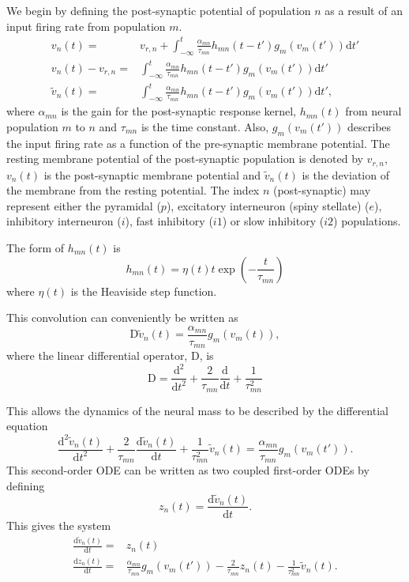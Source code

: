 \documentclass[]{article}
\begin{document}
We begin by defining the post-synaptic potential of population $n$ as a result of an input firing rate from population $m$.
\begin{align}
	v_n(t) =& v_{r,n} + \int_{-\infty}^t \frac{\alpha_{mn}}{\tau_{mn}} h_{mn}(t-t')g_m(v_m(t')) \mathrm{d}t' \\
	v_n(t) - v_{r,n} =& \int_{-\infty}^t \frac{\alpha_{mn}}{\tau_{mn}} h_{mn}(t-t')g_m(v_m(t')) \mathrm{d}t' \\
	\tilde v_n(t) =& \int_{-\infty}^t \frac{\alpha_{mn}}{\tau_{mn}} h_{mn}(t-t')g_m(v_m(t')) \mathrm{d}t',
\end{align}
where $\alpha_{mn}$ is the gain for the post-synaptic response kernel, $h_{mn}(t)$ from neural population $m$ to $n$ and $\tau_{mn}$ is the time constant. Also, $g_m(v_m(t'))$ describes the input firing rate as a function of the pre-synaptic membrane potential. The resting membrane potential of the post-synaptic population is denoted by $v_{r,n}$, $v_n(t)$ is the post-synaptic membrane potential and $\tilde v_n(t)$ is the deviation of the membrane from the resting potential. The index $n$ (post-synaptic) may represent either the pyramidal ($p$), excitatory interneuron (spiny stellate) ($e$), inhibitory interneuron ($i$), fast inhibitory ($i1$) or slow inhibitory ($i2$) populations.  

The form of $h_{mn}(t)$ is 
\begin{equation}
	h_{mn}(t) = \eta(t)t\exp\left(-\frac{t}{\tau_{mn}}\right)
\end{equation}
where $\eta(t)$ is the Heaviside step function.

This convolution can conveniently be written as
\begin{equation}
	\mathrm{D}\tilde v_n(t) = \frac{\alpha_{mn}}{\tau_{mn}} g_m(v_m(t)),
\end{equation}
where the linear differential operator, $\mathrm{D}$, is
\begin{equation}
	\mathrm{D} = \frac{\mathrm{d}^2}{\mathrm{d}t^2} + \frac{2}{\tau_{mn}}\frac{\mathrm{d}}{\mathrm{d}t} + \frac{1}{\tau_{mn}^2}
\end{equation}

This allows the dynamics of the neural mass to be described by the differential equation
\begin{equation}
	\frac{\mathrm{d}^2\tilde v_n(t)}{\mathrm{d}t^2} + \frac{2}{\tau_{mn}}\frac{\mathrm{d}\tilde v_n(t)}{\mathrm{d}t} + \frac{1}{\tau_{mn}^2}\tilde v_n(t) = \frac{\alpha_{mn}}{\tau_{mn}} g_m(v_m(t')).
\end{equation}
This second-order ODE can be written as two coupled first-order ODEs by defining
\begin{equation}
	z_n(t) = \frac{\mathrm{d}\tilde v_n(t)}{\mathrm{d}t}.
\end{equation}
This gives the system
\begin{align}
	\frac{\mathrm{d}\tilde v_n(t)}{\mathrm{d}t} =& z_n(t) \\
	\frac{\mathrm{d}z_n(t)}{\mathrm{d}t} =& \frac{\alpha_{mn}}{\tau_{mn}} g_m(v_m(t')) - \frac{2}{\tau_{mn}}z_n(t) - \frac{1}{\tau_{mn}^2}\tilde v_n(t).
\end{align}
\end{document}
